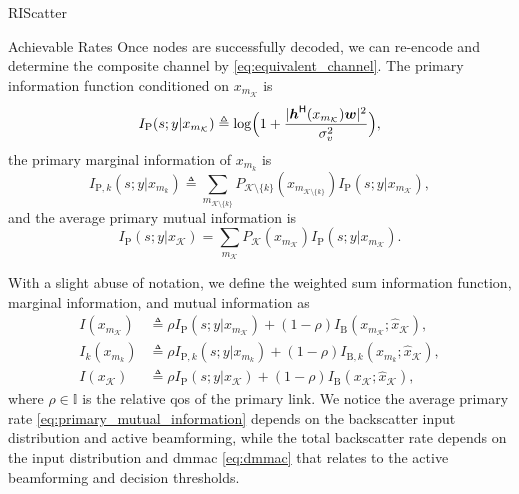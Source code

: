 \documentclass[journal]{IEEEtran}
\begin{document}
\begin{section}{RIScatter}
\begin{subsection}{Achievable Rates}
		Once nodes are successfully decoded, we can re-encode and determine the composite channel by \eqref{eq:equivalent_channel}.
		The primary information function conditioned on $x_{m_{\mathcal{K}}}$ is
		\begin{equation}
			I_{\text{P}}(s;y|x_{m_{\mathcal{K}}}) \triangleq \log \Bigl(1 + \frac{\lvert \boldsymbol{h}^\mathsf{H}(x_{m_{\mathcal{K}}}) \boldsymbol{w} \rvert^2}{\sigma_v^2}\Bigr),
			\label{eq:primary_information_function}
		\end{equation}
		the primary marginal information of $x_{m_k}$ is
		\begin{equation}
			I_{\text{P},k}(s;y|x_{m_k}) \triangleq \sum_{m_{\mathcal{K} \setminus \{k\}}} P_{\mathcal{K} \setminus \{k\}}(x_{m_{\mathcal{K} \setminus \{k\}}}) I_{\text{P}}(s;y|x_{m_{\mathcal{K}}}),
			\label{eq:primary_marginal_information}
		\end{equation}
		and the average primary mutual information is
		\begin{equation}
			I_{\text{P}}(s;y|x_{\mathcal{K}}) = \sum_{m_{\mathcal{K}}} P_{\mathcal{K}}(x_{m_{\mathcal{K}}}) I_{\text{P}}(s;y|x_{m_{\mathcal{K}}}).
			\label{eq:primary_mutual_information}
		\end{equation}

		With a slight abuse of notation, we define the weighted sum information function, marginal information, and mutual information as
		\begin{align}
			I(x_{m_{\mathcal{K}}})
			 & \triangleq \rho I_{\text{P}}(s;y|x_{m_{\mathcal{K}}}) + (1 - \rho) I_{\text{B}}(x_{m_{\mathcal{K}}};\hat{x}_{\mathcal{K}}),\label{eq:weighted_sum_information_function} \\
			I_k(x_{m_k})
			 & \triangleq \rho I_{\text{P},k}(s;y|x_{m_k}) + (1 - \rho) I_{\text{B},k}(x_{m_k};\hat{x}_{\mathcal{K}}),\label{eq:weighted_sum_marginal_information}                     \\
			I(x_{\mathcal{K}})
			 & \triangleq \rho I_{\text{P}}(s;y|x_{\mathcal{K}}) + (1 - \rho) I_{\text{B}}(x_{\mathcal{K}};\hat{x}_{\mathcal{K}}),\label{eq:weighted_sum_mutual_information}
		\end{align}
		where $\rho \in \mathbb{I}$ is the relative \gls{qos} of the primary link.
		We notice the average primary rate \eqref{eq:primary_mutual_information} depends on the backscatter input distribution and active beamforming, while the total backscatter rate depends on the input distribution and \gls{dmmac} \eqref{eq:dmmac} that relates to the active beamforming and decision thresholds.
		\label{st:information_theory}
	\end{subsection}
	\label{st:riscatter}
\end{section}
\end{document}
